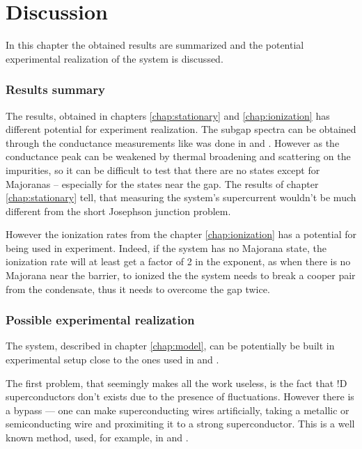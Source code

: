 \chapter{Discussion} 
\label{chap:discssion}
In this chapter the obtained results are summarized and the potential experimental realization of the system is discussed. 
\subsection{Results summary}
The results, obtained in chapters \ref{chap:stationary} and \ref{chap:ionization} has different potential for experiment realization. The subgap spectra can be obtained through the conductance measurements like was done in \cite{majorana_experiment_Kouwenhoven} and \cite{majorana_experiment_Zhang}. However as the conductance peak can be weakened by thermal broadening and scattering on the impurities, so it can be difficult to test that there are no states except for Majoranas -- especially for the states near the gap. The results of chapter \ref{chap:stationary} tell, that measuring the system's supercurrent wouldn't be much different from the short Josephson junction problem.

However the ionization rates from the chapter \ref{chap:ionization} has a potential for being used in experiment. Indeed, if the system has no Majorana state, the ionization rate will at least get a factor of 2 in the exponent, as when there is no Majorana near the barrier, to ionized the the system needs to break a cooper pair from the condensate, thus it needs to overcome the gap twice.

\subsection{Possible experimental realization}

The system, described in chapter \ref{chap:model}, can be potentially be built in experimental setup close to the ones used in \cite{majorana_experiment_Kouwenhoven} and \cite{majorana_experiment_Zhang}. 

The first problem, that seemingly makes all the work useless, is the fact that !D superconductors don't exists due to the presence of fluctuations. However there is a bypass --- one can make superconducting wires artificially, taking a metallic or semiconducting wire and proximiting it to a strong superconductor. This is a well known method, used, for example, in \cite{majorana_experiment_Kouwenhoven} and \cite{majorana_experiment_Zhang}. 

